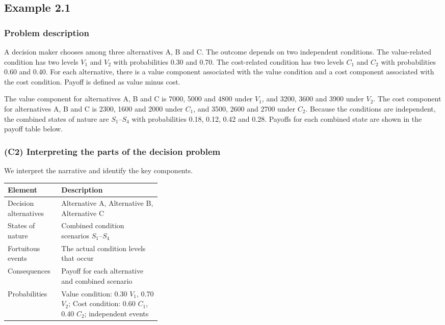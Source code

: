\subsection{Example 2.1}\label{sec:example2-1}

\subsubsection{Problem description}\label{subsec:example2-1-problem}

A decision maker chooses among three alternatives A, B and C. The outcome depends on two independent conditions. The value-related condition has two levels \(V_1\) and \(V_2\) with probabilities 0.30 and 0.70. The cost-related condition has two levels \(C_1\) and \(C_2\) with probabilities 0.60 and 0.40. For each alternative, there is a value component associated with the value condition and a cost component associated with the cost condition. Payoff is defined as value minus cost.

The value component for alternatives A, B and C is 7000, 5000 and 4800 under \(V_1\), and 3200, 3600 and 3900 under \(V_2\). The cost component for alternatives A, B and C is 2300, 1600 and 2000 under \(C_1\), and 3500, 2600 and 2700 under \(C_2\). Because the conditions are independent, the combined states of nature are \(S_1\)--\(S_4\) with probabilities 0.18, 0.12, 0.42 and 0.28. Payoffs for each combined state are shown in the payoff table below.


\subsubsection{(C2) Interpreting the parts of the decision problem}\label{subsubsec:example2-1-c2}

We interpret the narrative and identify the key components.

\begin{center}
	\begin{tabularx}{\linewidth}{@{}L{0.35\linewidth}Y@{}}
		\toprule
		Element & Description \\
		\midrule
		Decision alternatives & Alternative A, Alternative B, Alternative C \\
		States of nature & Combined condition scenarios \(S_1\)--\(S_4\) \\
		Fortuitous events & The actual condition levels that occur \\
		Consequences & Payoff for each alternative and combined scenario \\
		Probabilities & Value condition: 0.30 \(V_1\), 0.70 \(V_2\); Cost condition: 0.60 \(C_1\), 0.40 \(C_2\); independent events \\
		\bottomrule
	\end{tabularx}
\end{center}

